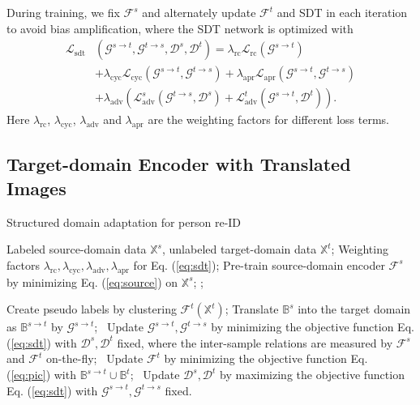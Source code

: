 \documentclass[journal]{IEEEtran}
\def\sB{{\mathbb{B}}}
\def\sX{{\mathbb{X}}}
\begin{document}
During training, we fix $\mathcal{F}^s$ and alternately update $\mathcal{F}^t$ and SDT in each iteration to avoid bias amplification,
where the SDT network is optimized with
{
\begin{align}
\mathcal{L}_\text{sdt}&(\mathcal{G}^{s\to t}, \mathcal{G}^{t\to s}, \mathcal{D}^s, \mathcal{D}^t) =
\lambda_\text{rc}\mathcal{L}_\text{rc}(\mathcal{G}^{s\to t}) \nonumber \\
&+\lambda_\text{cyc}\mathcal{L}_\text{cyc}(\mathcal{G}^{s\to t}, \mathcal{G}^{t\to s})
+\lambda_\text{apr}\mathcal{L}_\text{apr}(\mathcal{G}^{s\to t}, \mathcal{G}^{t\to s}) \nonumber \\
&+\lambda_\text{adv}\left(\mathcal{L}_\text{adv}^s(\mathcal{G}^{t\to s}, \mathcal{D}^s)+\mathcal{L}_\text{adv}^t(\mathcal{G}^{s\to t}, \mathcal{D}^t)\right).
\label{eq:sdt}
\end{align}}Here $\lambda_\text{rc}$, $\lambda_\text{cyc}$, $\lambda_\text{adv}$ and $\lambda_\text{apr}$ are the weighting factors for different loss terms.



\subsection{Target-domain Encoder with Translated Images}
\label{sec:joint}


\begin{algorithm}[tb]
\caption{Structured domain adaptation for person re-ID}
\label{overallalg}
\footnotesize
\begin{algorithmic}[1]
\REQUIRE Labeled source-domain data $\sX^s$, unlabeled target-domain data $\sX^t$;
\REQUIRE Weighting factors $\lambda_\text{rc},\lambda_\text{cyc},\lambda_\text{adv},\lambda_\text{apr}$ for Eq. (\ref{eq:sdt});
\STATE Pre-train source-domain encoder $\mathcal{F}^s$ by minimizing Eq. (\ref{eq:source}) on $\sX^s$;
;

\STATE Create pseudo labels by clustering $\mathcal{F}^t(\sX^t)$;
\FOR{each mini-batch $\sB^s \subset \sX^s$, $\sB^t \subset \sX^t$}
\STATE Translate $\sB^s$ into the target domain as $\sB^{s\to t}$ by $\mathcal{G}^{s\to t}$; \
\STATE Update $\mathcal{G}^{s\to t}, \mathcal{G}^{t\to s}$ by minimizing the objective function Eq. (\ref{eq:sdt}) with $\mathcal{D}^s, \mathcal{D}^t$ fixed, where the inter-sample relations are measured by $\mathcal{F}^s$ and $\mathcal{F}^t$ on-the-fly; \
\STATE Update $\mathcal{F}^t$ by minimizing the objective function Eq. (\ref{eq:pic}) with $\sB^{s\to t} \cup \sB^t$; \
\STATE Update $\mathcal{D}^s, \mathcal{D}^t$ by maximizing the objective function Eq. (\ref{eq:sdt}) with $\mathcal{G}^{s\to t}, \mathcal{G}^{t\to s}$ fixed. \
\ENDFOR
\ENDFOR
\end{algorithmic}
\end{algorithm}
\end{document}
